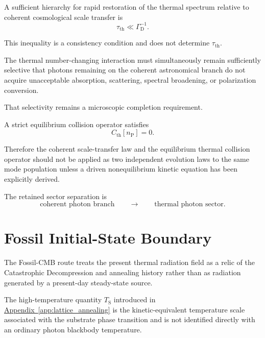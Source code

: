 A sufficient hierarchy for rapid restoration of the thermal spectrum
relative to coherent cosmological scale transfer is
\begin{equation}
    \tau_{\mathrm{th}}
    \ll
    \Gamma_{\mathrm D}^{-1}.
    \label{eq:AT_thermalization_hierarchy}
\end{equation}

This inequality is a consistency condition and does not determine
\(\tau_{\mathrm{th}}\).

The thermal number-changing interaction must simultaneously remain
sufficiently selective that photons remaining on the coherent astronomical
branch do not acquire unacceptable absorption, scattering, spectral
broadening, or polarization conversion.

That selectivity remains a microscopic completion requirement.

A strict equilibrium collision operator satisfies
\begin{equation}
    C_{\mathrm{th}}[n_{\mathrm P}]
    =
    0.
    \label{eq:AT_equilibrium_collision_zero}
\end{equation}

Therefore the coherent scale-transfer law and the equilibrium thermal
collision operator should not be applied as two independent evolution laws
to the same mode population unless a driven nonequilibrium kinetic equation
has been explicitly derived.

The retained sector separation is
\begin{equation}
    \text{coherent photon branch}
    \qquad\longrightarrow\qquad
    \text{thermal photon sector}.
    \label{eq:AT_sector_separation}
\end{equation}


\section{Fossil Initial-State Boundary}

The Fossil-CMB route treats the present thermal radiation field as a relic of
the Catastrophic Decompression and annealing history rather than as radiation
generated by a present-day steady-state source.

The high-temperature quantity
$T_{\mathrm S}$
introduced in
\hyperref[app:lattice_annealing]{Appendix~\ref*{app:lattice_annealing}}
is the kinetic-equivalent temperature scale associated with the substrate
phase transition and is not identified directly with an ordinary photon
blackbody temperature.

